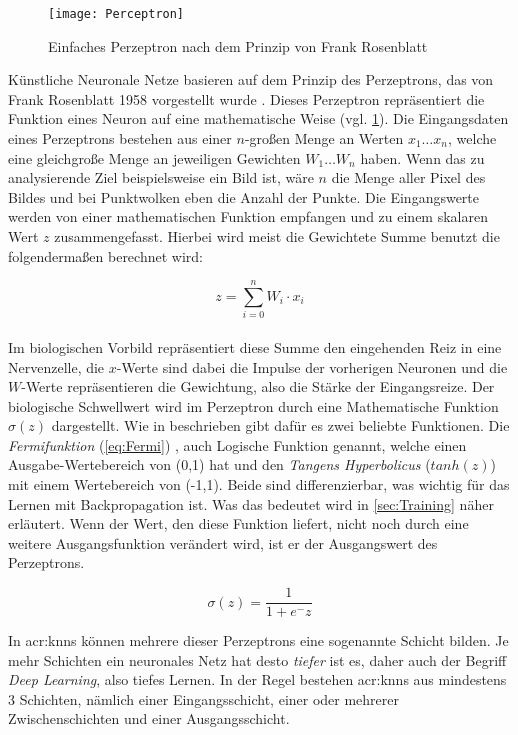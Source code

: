 \begin{figure}%
	\centering
    \texttt{[image: Perceptron]}
    \caption{Einfaches Perzeptron nach dem Prinzip von Frank Rosenblatt}
    \label{fig:Perceptron}
\end{figure}

Künstliche Neuronale Netze basieren auf dem Prinzip des Perzeptrons, das von Frank Rosenblatt 1958 vorgestellt wurde \cite{bib:Perzeptron}. Dieses Perzeptron repräsentiert die Funktion eines Neuron auf eine mathematische Weise (vgl. \ref{fig:Perceptron}). Die Eingangsdaten eines Perzeptrons bestehen aus einer \(n\)-großen Menge an Werten \(x_1 \dots x_n\), welche eine gleichgroße Menge an jeweiligen Gewichten \(W_1 \dots W_n\) haben. Wenn das zu analysierende Ziel beispielsweise ein Bild ist, wäre \(n\) die Menge aller Pixel des Bildes und bei Punktwolken eben die Anzahl der Punkte. Die Eingangswerte werden von einer mathematischen Funktion empfangen und zu einem skalaren Wert \(z\) zusammengefasst. Hierbei wird meist die Gewichtete Summe benutzt die folgendermaßen berechnet wird:

\begin{equation}
z = \sum \limits_{i=0}^{n} W_i \cdot x_i
\end{equation}\\

Im biologischen Vorbild repräsentiert diese Summe den eingehenden Reiz in eine Nervenzelle, die \(x\)-Werte sind dabei die Impulse der vorherigen Neuronen und die \(W\)-Werte repräsentieren die Gewichtung, also die Stärke der Eingangsreize. Der biologische Schwellwert wird im Perzeptron durch eine Mathematische Funktion \(\sigma(z)\) dargestellt. Wie in \cite{bib:NeuronaleNetze} beschrieben gibt dafür es zwei beliebte Funktionen. Die \textit{Fermifunktion} (\ref{eq:Fermi}) , auch Logische Funktion genannt, welche einen Ausgabe-Wertebereich von (0,1) hat und den \textit{Tangens Hyperbolicus} (\(tanh(z)\)) mit einem Wertebereich von (-1,1). Beide sind differenzierbar, was wichtig für das Lernen mit Backpropagation ist. Was das bedeutet wird in \ref{sec:Training} näher erläutert. Wenn der Wert, den diese Funktion liefert, nicht noch durch eine weitere Ausgangsfunktion verändert wird, ist er der Ausgangswert des Perzeptrons.

\begin{equation}
\sigma(z) = \frac{1}{1 + e^-z}
\label{eq:Fermi}
\end{equation}

In \acrshort{acr:knn}s können mehrere dieser Perzeptrons eine sogenannte Schicht bilden. Je mehr Schichten ein neuronales Netz hat desto \textit{tiefer} ist es, daher auch der Begriff \textit{Deep Learning}, also tiefes Lernen. In der Regel bestehen \acrshort{acr:knn}s aus mindestens 3 Schichten, nämlich einer Eingangsschicht, einer oder mehrerer Zwischenschichten und einer Ausgangsschicht.

